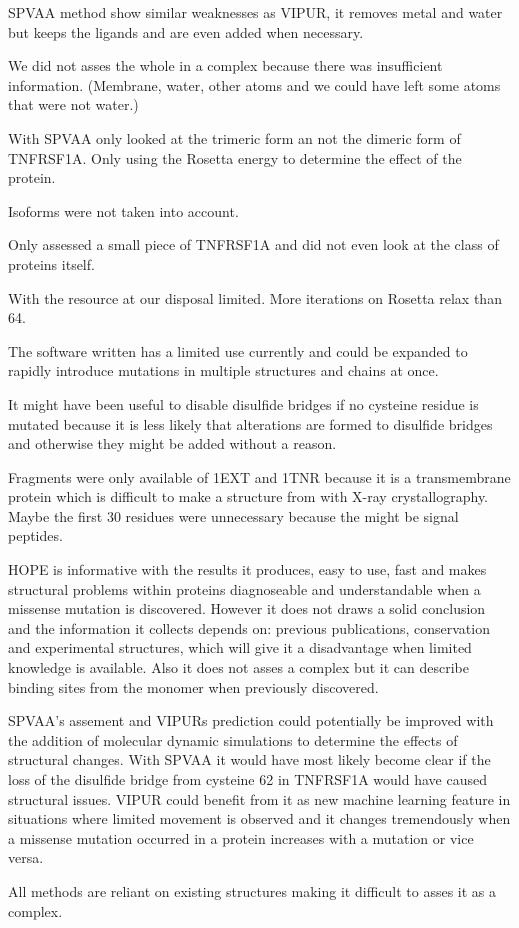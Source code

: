 SPVAA method show similar weaknesses as VIPUR, it removes metal and water but keeps the ligands and are even added when necessary.

We did not asses the whole in a complex because there was insufficient information. (Membrane, water, other atoms and we could have left some atoms that were not water.)

With SPVAA only looked at the trimeric form an not the dimeric form of TNFRSF1A.
Only using the Rosetta energy to determine the effect of the protein.

Isoforms were not taken into account.

Only assessed a small piece of TNFRSF1A and did not even look at the class of proteins itself.

With the resource at our disposal  limited.
More iterations on Rosetta relax than 64\cite{}.

The software written has a limited use currently and could be expanded to rapidly introduce mutations in multiple structures and chains at once.

It might have been useful to disable disulfide bridges if no cysteine residue is mutated because it is less likely that alterations are formed to disulfide bridges and otherwise they might be added without a reason.

Fragments were only available of 1EXT and 1TNR because it is a transmembrane protein which is difficult to make a structure from with X-ray crystallography.
Maybe the first 30 residues were unnecessary because the might be signal peptides. 

HOPE is informative with the results it produces, easy to use, fast and makes structural problems within proteins diagnoseable and understandable when a missense mutation is discovered. However it does not draws a solid conclusion and the information it collects depends on: previous publications, conservation and experimental structures, which will give it a disadvantage when limited knowledge is available. Also it does not asses a complex but it can describe binding sites from the monomer when previously discovered.


SPVAA's assement and VIPURs prediction could potentially be improved with the addition of molecular dynamic simulations to determine the effects of structural changes. With SPVAA it would have most likely become clear if the loss of the disulfide bridge from cysteine 62 in TNFRSF1A would have caused structural issues. VIPUR could benefit from it as new machine learning feature in situations where limited movement is observed and it changes tremendously when a missense mutation occurred in a protein increases with a mutation or vice versa.



All methods are reliant on existing structures making it difficult to asses it as a complex.
